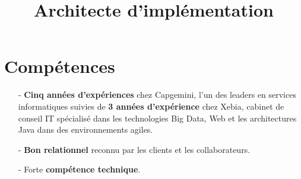 \documentclass[11pt,a4paper]{moderncv}
\title{Architecte d'implémentation}
\begin{document}
\maketitle

\section{Compétences}
\begin{itemize}
\item[-] \textbf{Cinq années d'expériences} chez Capgemini, l'un des leaders en services informatiques suivies de \textbf{3 années d'expérience} chez Xebia, cabinet de conseil IT spécialisé dans les technologies Big Data, Web et les architectures Java dans des environnements agiles.
\item[-] \textbf{Bon relationnel} reconnu par les clients et les collaborateurs.
\item[-] Forte \textbf{compétence technique}.
\end{itemize}
\end{document}

